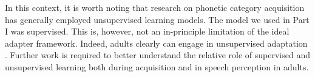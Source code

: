 In this context, it is worth noting that research on phonetic category acquisition has generally employed unsupervised learning models. The model we used in Part I was supervised. This is, however, not an in-principle limitation of the ideal adapter framework. Indeed, adults clearly can engage in unsupervised adaptation \autocite{Clayards2008,Munson2011}. Further work is required to better understand the relative role of supervised and unsupervised learning \autocite[or the continuum between these extremes; e.g.,][]{Gibson2013,Zhu2007} both during acquisition and in speech perception in adults.


